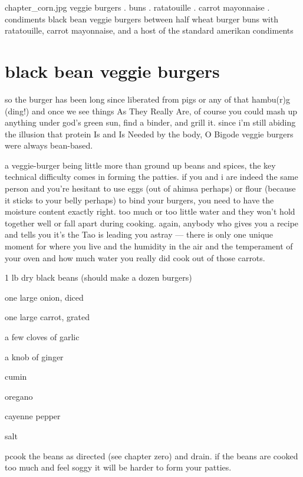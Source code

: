 \mychapter
{chapter_corn.jpg}
{veggie burgers . buns . ratatouille . carrot mayonnaise . condiments}
{black bean veggie burgers between half wheat burger buns with
ratatouille, carrot mayonnaise, and a host of the standard amerikan
condiments}

\section{black bean veggie burgers}

so the burger has been long since liberated from pigs or any of that hambu(r)g 
(ding!) and once we see things As They Really Are, of course you could mash up 
anything under god's green sun, find a binder, and grill it. since i'm still 
abiding the illusion that protein Is and Is Needed by the body, O Bigode 
veggie burgers were always bean-based.

a veggie-burger being little more than ground up beans and spices, the key 
technical difficulty comes in forming the patties. if you and i are indeed the 
same person and you're hesitant to use eggs (out of ahimsa perhaps) or flour 
(because it sticks to your belly perhaps) to bind your burgers, you need to 
have the moisture content exactly right. too much or too little water and they 
won't hold together well or fall apart during cooking. again, anybody who 
gives you a recipe and tells you it's the Tao is leading you astray --- there 
is only one unique moment for where you live and the humidity in the air and 
the temperament of your oven and how much water you really did cook out of 
those carrots.

\begin{ingredients}
  \item 1 lb dry black beans (should make a dozen burgers)
  \item one large onion, diced
  \item one large carrot, grated
  \item a few cloves of garlic
  \item a knob of ginger
  \item cumin
  \item oregano
  \item cayenne pepper
  \item salt
\end{ingredients}

pcook the beans as directed (see chapter zero) and drain. if the beans are 
cooked too much and feel soggy it will be harder to form your patties.

